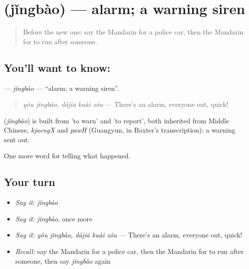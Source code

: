 \section[\texorpdfstring{\zh{警报} (jǐngbào)}{警报 (jǐngbào)}]{ (jǐngbào) — alarm; a warning siren}

\label{lesson:ZH-C311-jingbao}



\begin{quote}
Before the new one: say the Mandarin for a police car, then the Mandarin for to run after someone.
\end{quote}

\subsection*{You'll want to know: }
\textbf{} — \emph{jǐngbào} — \textquotedblleft{}alarm; a warning siren\textquotedblright{}.

\begin{quote}
\textbf{} \emph{yǒu jǐngbào, dàjiā kuài zǒu} — There's an alarm, everyone out, quick!
\end{quote}

\begin{cousinweb}
\textbf{} (\emph{jǐngbào}) is built from  'to warn' and  'to report', both inherited from Middle Chinese, \emph{kjaengX} and \emph{pawH} (Guangyun, in Baxter's transcription): a warning sent out.
\end{cousinweb}

\begin{grammarlens}[title={What you've built}]
One more word for telling what happened.
\end{grammarlens}

\subsection*{Your turn}
\begin{itemize}
\raggedright
  \item \emph{Say it:} \emph{jǐngbào}
  \item \emph{Say it:} \emph{jǐngbào}, once more
  \item \emph{Say it:} \emph{yǒu jǐngbào, dàjiā kuài zǒu} — There's an alarm, everyone out, quick!
  \item \emph{Recall:} say the Mandarin for a police car, then the Mandarin for to run after someone, then say \emph{jǐngbào} again
\end{itemize}

